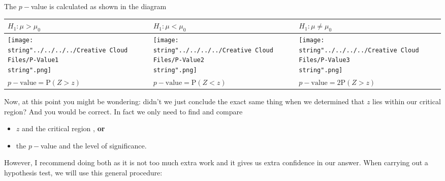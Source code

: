 \documentclass[11pt,a4paper]{book}
\begin{document}
\newpage

The $p-$value is calculated as shown in the diagram

\medskip

\setlength{\extrarowheight}{2pt}%
\begin{tabular}{|>{\centering}p{5cm}|>{\centering}p{5cm}|>{\centering}p{5cm}|}
\hline
$H_{1}:\mu>\mu_{0}$ & $H_{1}:\mu<\mu_{0}$ & $H_{1}:\mu\neq\mu_{0}$\tabularnewline
\hline
\centering{}\texttt{[image: \\string"../../../../Creative Cloud Files/P-Value1\\string".png]} & \centering{}\texttt{[image: \\string"../../../../Creative Cloud Files/P-Value2\\string".png]} & \centering{}\texttt{[image: \\string"../../../../Creative Cloud Files/P-Value3\\string".png]}\tabularnewline
\hline
$p-\text{value}=\text{P}\left(Z>z\right)$ & $p-\text{value}=\text{P}\left(Z<z\right)$ & $p-\text{value}=2\text{P}\left(Z>z\right)$\tabularnewline
\hline
\end{tabular}

\bigskip

Now, at this point you might be wondering: didn't we just conclude
the exact same thing when we determined that $z$ lies within our
critical region? And you would be correct. In fact we only need to
find and compare
\begin{itemize}
\item $z$ and the critical region , \textbf{or}
\item the $p-$value and the level of significance.
\end{itemize}
However, I recommend doing both as it is not too much extra work
and it gives us extra confidence in our answer. When carrying out a hypothesis test, we will use this general procedure:

\medskip
\end{document}
